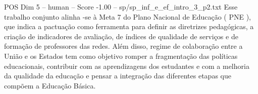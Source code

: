 \begin{textsample}{POS Dim 5 – human – Score -1.00 – sp/sp\_inf\_e\_ef\_intro\_3\_p2.txt}  \label{ex:f5_pos_018}
Esse trabalho conjunto alinha -se à Meta 7 do Plano Nacional de Educação ( PNE ), que indica a pactuação como ferramenta para definir as diretrizes pedagógicas, a criação de indicadores de avaliação, de índices de qualidade de serviços e de formação de professores das redes.
Além disso, regime de colaboração entre a União e os Estados tem como objetivo romper a fragmentação das políticas educacionais, contribuir com as aprendizagens dos estudantes e com a melhoria da qualidade da educação e pensar a integração das diferentes etapas que compõem a Educação Básica.

\end{textsample}
